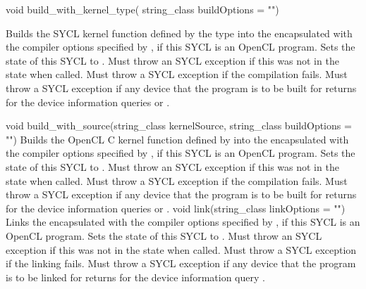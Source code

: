     {void build_with_kernel_type(}
    {string_class buildOptions = "")}
    {
      Builds the SYCL kernel function defined by the type  into the encapsulated  with the compiler options specified by , if this SYCL  is an OpenCL program. Sets the state of this SYCL  to . Must throw an  SYCL exception if this  was not in the  state when called. Must throw a   SYCL exception if the compilation fails.  Must throw a  SYCL exception if any device that the program is to be built for returns  for the device information queries  or .

    }
  \addRowTwoL
    {void build_with_source(string_class kernelSource, }
    {string_class buildOptions = "")}
    {
      Builds the OpenCL C kernel function defined by  into the encapsulated  with the compiler options specified by , if this SYCL  is an OpenCL program. Sets the state of this SYCL  to . Must throw an  SYCL exception if this  was not in the  state when called. Must throw a   SYCL exception if the compilation fails.  Must throw a  SYCL exception if any device that the program is to be built for returns  for the device information queries  or .
    }
  \addRow
    {void link(string_class linkOptions = "")}
    {
      Links the encapsulated  with the compiler options specified by , if this SYCL  is an OpenCL program. Sets the state of this SYCL  to . Must throw an  SYCL exception if this  was not in the  state when called. Must throw a  SYCL exception if the linking fails.  Must throw a  SYCL exception if any device that the program is to be linked for returns  for the device information query .
    }
